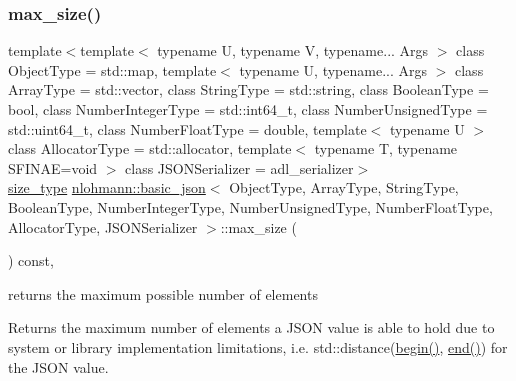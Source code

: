 \subsubsection{\texorpdfstring{max\+\_\+size()}{max\_size()}}
{\footnotesize\ttfamily template$<$template$<$ typename U, typename V, typename... Args $>$ class Object\+Type = std\+::map, template$<$ typename U, typename... Args $>$ class Array\+Type = std\+::vector, class String\+Type  = std\+::string, class Boolean\+Type  = bool, class Number\+Integer\+Type  = std\+::int64\+\_\+t, class Number\+Unsigned\+Type  = std\+::uint64\+\_\+t, class Number\+Float\+Type  = double, template$<$ typename U $>$ class Allocator\+Type = std\+::allocator, template$<$ typename T, typename S\+F\+I\+N\+A\+E=void $>$ class J\+S\+O\+N\+Serializer = adl\+\_\+serializer$>$ \\
\mbox{\hyperlink{classnlohmann_1_1basic__json_a39f2cd0b58106097e0e67bf185cc519b}{size\+\_\+type}} \mbox{\hyperlink{classnlohmann_1_1basic__json}{nlohmann\+::basic\+\_\+json}}$<$ Object\+Type, Array\+Type, String\+Type, Boolean\+Type, Number\+Integer\+Type, Number\+Unsigned\+Type, Number\+Float\+Type, Allocator\+Type, J\+S\+O\+N\+Serializer $>$\+::max\+\_\+size (\begin{DoxyParamCaption}{ }\end{DoxyParamCaption}) const\hspace{0.3cm}{\ttfamily [inline]}, {\ttfamily [noexcept]}}



returns the maximum possible number of elements 

Returns the maximum number of elements a J\+S\+ON value is able to hold due to system or library implementation limitations, i.\+e. {\ttfamily std\+::distance(\mbox{\hyperlink{classnlohmann_1_1basic__json_a0ff28dac23f2bdecee9564d07f51dcdc}{begin()}}, \mbox{\hyperlink{classnlohmann_1_1basic__json_a13e032a02a7fd8a93fdddc2fcbc4763c}{end()}})} for the J\+S\+ON value.

